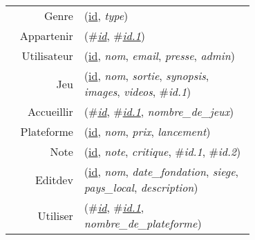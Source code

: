 
\usepackage[normalem]{ulem}
\newenvironment{mld}
  {\par\begin{minipage}{\linewidth}\begin{tabular}{rp{0.7\linewidth}}}
  {\end{tabular}\end{minipage}\par}
\newcommand{\relat}[1]{\textsc{#1}}
\newcommand{\attr}[1]{\emph{#1}}
\newcommand{\prim}[1]{\uline{#1}}
\newcommand{\foreign}[1]{\#\textsl{#1}}


\begin{mld}
  Genre & (\prim{id}, \attr{type})\\
  Appartenir & (\foreign{\prim{id}}, \foreign{\prim{id.1}})\\
  Utilisateur & (\prim{id}, \attr{nom}, \attr{email}, \attr{presse}, \attr{admin})\\
  Jeu & (\prim{id}, \attr{nom}, \attr{sortie}, \attr{synopsis}, \attr{images}, \attr{videos}, \foreign{id.1})\\
  Accueillir & (\foreign{\prim{id}}, \foreign{\prim{id.1}}, \attr{nombre\_de\_jeux})\\
  Plateforme & (\prim{id}, \attr{nom}, \attr{prix}, \attr{lancement})\\
  Note & (\prim{id}, \attr{note}, \attr{critique}, \foreign{id.1}, \foreign{id.2})\\
  Editdev & (\prim{id}, \attr{nom}, \attr{date\_fondation}, \attr{siege}, \attr{pays\_local}, \attr{description})\\
  Utiliser & (\foreign{\prim{id}}, \foreign{\prim{id.1}}, \attr{nombre\_de\_plateforme})\\
\end{mld}